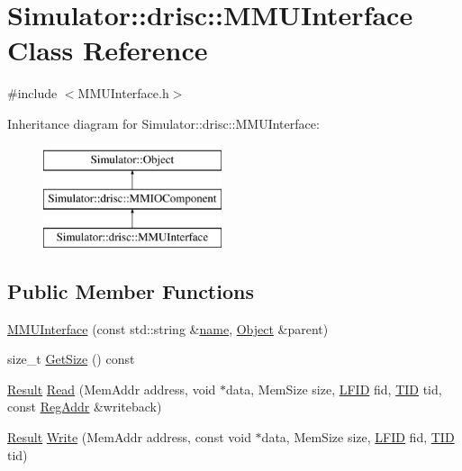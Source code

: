 \hypertarget{class_simulator_1_1drisc_1_1_m_m_u_interface}{\section{Simulator\+:\+:drisc\+:\+:M\+M\+U\+Interface Class Reference}
\label{class_simulator_1_1drisc_1_1_m_m_u_interface}
}


{\ttfamily \#include $<$M\+M\+U\+Interface.\+h$>$}

Inheritance diagram for Simulator\+:\+:drisc\+:\+:M\+M\+U\+Interface\+:\begin{figure}[H]
\begin{center}
\leavevmode
\includegraphics[height=3.000000cm]{class_simulator_1_1drisc_1_1_m_m_u_interface}
\end{center}
\end{figure}
\subsection*{Public Member Functions}
\begin{DoxyCompactItemize}
\item 
\hyperlink{class_simulator_1_1drisc_1_1_m_m_u_interface_ad681ed5e952e007a18c6abeec1dc56df}{M\+M\+U\+Interface} (const std\+::string \&\hyperlink{mtconf_8c_a8f8f80d37794cde9472343e4487ba3eb}{name}, \hyperlink{class_simulator_1_1_object}{Object} \&parent)
\item 
size\+\_\+t \hyperlink{class_simulator_1_1drisc_1_1_m_m_u_interface_a6f8591d1c93f15664788356e14a53d1d}{Get\+Size} () const 
\item 
\hyperlink{namespace_simulator_a4b6b5616e7236c0c131516a441776805}{Result} \hyperlink{class_simulator_1_1drisc_1_1_m_m_u_interface_ac5a73e4db3acde7054a14cb93fc4a5c5}{Read} (Mem\+Addr address, void $\ast$data, Mem\+Size size, \hyperlink{namespace_simulator_aaccbc706b2d6c99085f52f6dfc2333e4}{L\+F\+I\+D} fid, \hyperlink{namespace_simulator_a483cc4ecee1736e895054617672cded5}{T\+I\+D} tid, const \hyperlink{struct_simulator_1_1_reg_addr}{Reg\+Addr} \&writeback)
\item 
\hyperlink{namespace_simulator_a4b6b5616e7236c0c131516a441776805}{Result} \hyperlink{class_simulator_1_1drisc_1_1_m_m_u_interface_a8a85bcdf081e404d1803c12602e98859}{Write} (Mem\+Addr address, const void $\ast$data, Mem\+Size size, \hyperlink{namespace_simulator_aaccbc706b2d6c99085f52f6dfc2333e4}{L\+F\+I\+D} fid, \hyperlink{namespace_simulator_a483cc4ecee1736e895054617672cded5}{T\+I\+D} tid)
\end{DoxyCompactItemize}


